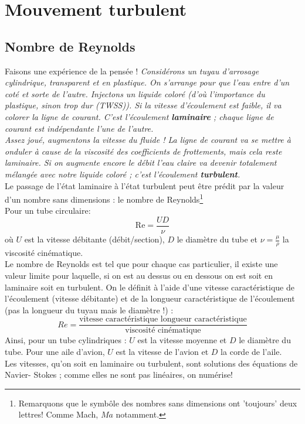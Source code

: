 \section{Mouvement turbulent}
\subsection{Nombre de Reynolds}
Faisons une expérience de la pensée ! \textit{Considérons un tuyau d'arrosage cylindrique,
	transparent et en plastique. On s'arrange pour que l'eau entre d'un coté et sorte de l'autre.
	Injectons un liquide coloré (d'où l'importance du plastique, sinon trop dur (TWSS)). Si la
	vitesse d'écoulement est faible, il va colorer la ligne de courant. C'est l'écoulement 
	\textbf{laminaire} ; chaque ligne de courant est indépendante l'une de l'autre.}\\
	
\textit{Assez joué, augmentons la vitesse du fluide ! La ligne de courant va se mettre à onduler à
	cause de la viscosité des coefficients de frottements, mais cela reste laminaire. Si on augmente
	encore le débit l'eau claire va devenir totalement mélangée avec notre liquide coloré ; c'est 
	l'écoulement \textbf{turbulent}.}\ \\
	
Le passage de l'état laminaire à l'état turbulent peut être prédit par la valeur d'un
nombre sans dimensions : le nombre de Reynolds\footnote{Remarquons que le symbôle des
	nombres sans dimensions ont 'toujours' deux lettres! Comme Mach, $Ma$ notamment.}\\
Pour un tube circulaire:
\begin{equation}
	\text{Re} = \frac{UD}{\nu}
\end{equation}
où $U$ est la vitesse débitante (débit/section), $D$ le diamètre du tube et $\nu = \frac{
	\mu}{\rho}$ la 	viscosité cinématique.\\
		
	
Le nombre de Reynolds est tel que pour chaque cas particulier, il existe une valeur limite pour 
laquelle, si on est au dessus ou en dessous on est soit en laminaire soit en turbulent. On le 
définit à l'aide d'une vitesse caractéristique de l’écoulement (vitesse débitante) et de la longueur
caractéristique de l’écoulement (pas la longueur du tuyau mais le diamètre !)	:
\begin{equation}
	Re = \frac{\text{vitesse caractéristique\ \ \ \ \ longueur caractéristique}}{\text{viscosité 
	cinématique}}
\end{equation}
Ainsi, pour un tube cylindriques : $U$ est la vitesse moyenne et $D$ le diamètre du tube. Pour
une aile d'avion, $U$ est la vitesse de l'avion et $D$ la corde de l'aile.\\
Les vitesses, qu'on soit en laminaire ou turbulent, sont solutions des équations de Navier-
Stokes ; comme elles ne sont pas linéaires, on numérise!
	
